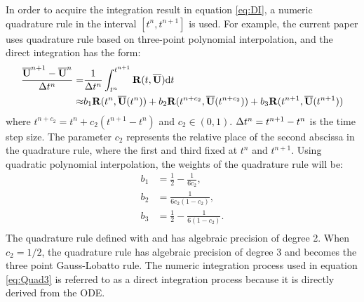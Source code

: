 In order to acquire the integration result in equation
\eqref{eq:DI}, a numeric quadrature rule in the interval
$[t^n, t^{n+1}]$ is used. For example, the current paper
uses quadrature rule based on three-point polynomial 
interpolation, and the direct integration has 
the form:
\begin{equation}
    \label{eq:Quad3}
    \begin{aligned}
        \frac{\overline{\mathbf{U}}^{n+1} - \overline{\mathbf{U}}^{n}}{{\Delta} t^n} = & \frac{1}{{\Delta} t^n}
        \int_{t^n}^{t^{n+1}}{
        \mathbf{R}(t, \overline{\mathbf{U}}) \dd t
        }                                                           \\ \approx &
        b_1\mathbf{R}(t^n, \overline{\mathbf{U}}(t^n))
        +
        b_2\mathbf{R}(t^{n+c_2}, \overline{\mathbf{U}}(t^{n+c_2}))
        +
        b_3\mathbf{R}(t^{n+1}, \overline{\mathbf{U}}(t^{n+1}))
    \end{aligned}
\end{equation}
where $t^{n+c_2} = t^{n} + c_2 (t^{n+1} - t^n)$ and $c_2\in(0,1)$.
${\Delta} t^n=t^{n+1} - t^n$ is
the time step size.
The parameter $c_2$ represents the relative place of the second abscissa
in the quadrature rule, where the first and third fixed at $t^{n}$ and $t^{n + 1}$.
Using quadratic polynomial interpolation,
the weights of the quadrature rule will be:
\begin{equation}
    \begin{aligned}
        b_1 & = \frac{1}{2} - \frac{1}{6{c_2}},     \\
        b_2 & = \frac{1}{6{c_2}(1-{c_2})},          \\
        b_3 & = \frac{1}{2} - \frac{1}{6(1-{c_2})}. \\
    \end{aligned}
    \label{eq:integ0}
\end{equation}
The quadrature rule defined with
 and  has algebraic precision
of degree 2. When $c_2=1/2$, the quadrature rule has algebraic precision of
degree 3 and becomes the three point Gauss-Lobatto rule.
The numeric integration process used in equation \eqref{eq:Quad3}
is referred to as a direct integration process because it is
directly derived from the ODE.



